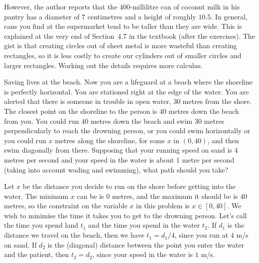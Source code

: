 However, the author reports that the $400$-millilitre can of coconut milk in his pantry
has a diameter of
$7$ centimetres and a height of roughly $10.5$. In general, cans you find at the supermarket tend
to be taller than they are wide. This is explained at the very end of Section~4.7 in the textbook (after
the exercises). The gist is that creating circles out of sheet metal is more wasteful than creating
rectangles, so it is less costly to create our cylinders out of smaller circles and larger rectangles.
Working out the details requires more calculus.

\medskip\boldlabel Saving lives at the beach. Now you are a lifeguard at a beach where the shoreline is
perfectly horizontal. You are stationed right at the edge of the water. You are alerted that there is
someone in trouble in open water, 30 metres from the shore. The closest point on the shoreline to the
person is 40 metres down the beach from you. You could run 40 metres down the beach and swim 30
metres perpendicularly to reach the drowning person, or you could swim horizontally or you could run
$x$ metres along the shoreline, for some $x$ in $(0,40)$, and then swim diagonally from there.
Supposing that your running speed on sand is 4 metres per second and your
speed in the water is about 1 metre per second (taking into account wading and swimming),
what path should you take?

Let $x$ be the distance you decide to run on the shore before getting into the water. The minimum
$x$ can be is $0$ metres, and the maximum it should be is $40$ metres, so the constraint on the variable
$x$ in this problem is $x\in [0,40]$.
We wish to minimise the time it takes you to get to the drowning person. Let's call the time you spend
land $t_1$ and the time you spend in the water $t_2$. If $d_1$ is the distance we travel on the beach,
then we have $t_1 = d_1/4$, since you run at $4$ m/s on sand. If $d_2$ is the (diagonal) distance
between the point you enter the water and the patient, then $t_2 = d_2$, since your speed in the water
is $1$ m/s.

